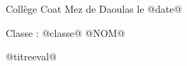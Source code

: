 \setcounter{exo}{0}


Collège Coat Mez de Daoulas  \hfill  le @date@

Classe : @classe@ \hfill @NOM@

\begin{center}
\begin{LARGE} @titreeval@ \end{LARGE}
\end{center}


